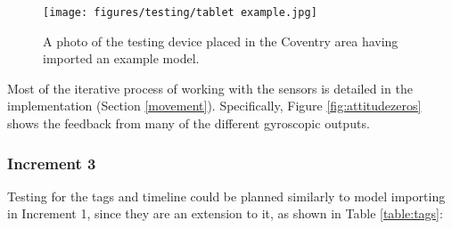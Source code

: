 \documentclass[12pt, a4paper]{article}
\begin{document}
\begin{figure}[]
    \centering
    \texttt{[image: figures/testing/tablet example.jpg]}
        \caption{A photo of the testing device placed in the Coventry area having imported an example model.}
        \label{fig:testingontablet}
\end{figure}

Most of the iterative process of working with the sensors is detailed in the implementation (Section \ref{movement}). Specifically, Figure \ref{fig:attitudezeros} shows the feedback from many of the different gyroscopic outputs.

\subsubsection{Increment 3}
Testing for the tags and timeline could be planned similarly to model importing in Increment 1, since they are an extension to it, as shown in Table \ref{table:tags}:
\end{document}
